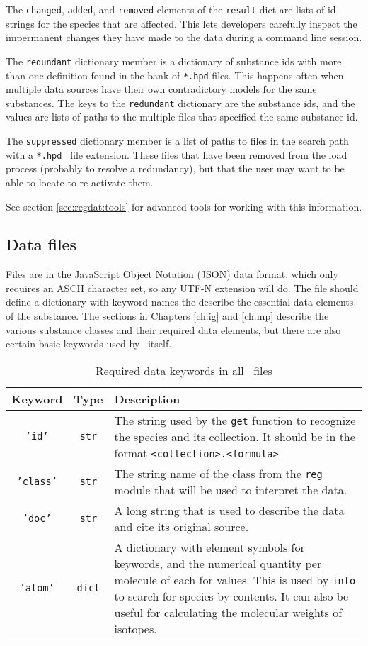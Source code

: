The \texttt{changed}, \texttt{added}, and \texttt{removed} elements of the \texttt{result} dict are lists of id strings for the species that are affected.  This lets developers carefully inspect the impermanent changes they have made to the data during a command line session.

The \texttt{redundant} dictionary member is a dictionary of substance ids with more than one definition found in the bank of \texttt{*.hpd} files.  This happens often when multiple data sources have their own contradictory models for the same substances.  The keys to the \texttt{redundant} dictionary are the substance ids, and the values are lists of paths to the multiple files that specified the same substance id.

The \texttt{suppressed} dictionary member is a list of paths to files in the search path with a \texttt{*.hpd~} file extension.  These files that have been removed from the load process (probably to resolve a redundancy), but that the user may want to be able to locate to re-activate them.

See section \ref{sec:regdat:tools} for advanced tools for working with this information.

\subsection{Data files}\label{sec:regdat:data}

Files are in the JavaScript Object Notation (JSON) data format, which only requires an ASCII character set, so any UTF-N extension will do.  The file should define a dictionary with keyword names the describe the essential data elements of the substance.  The sections in Chapters \ref{ch:ig} and \ref{ch:mp} describe the various substance classes and their required data elements, but there are also certain basic keywords used by \PM\ itself.

\begin{table}
\centering
\caption{Required data keywords in all \PM\ files}\label{tab:data:required}
\begin{tabular}{|ccp{2.5in}|}
\hline
Keyword & Type & Description\\
\hline
\texttt{'id'} & \texttt{str} & The string used by the \texttt{get} function to recognize the species and its collection.  It should be in the format \texttt{<collection>.<formula>}\\
\texttt{'class'} & \texttt{str} & The string name of the class from the \texttt{reg} module that will be used to interpret the data.\\
\texttt{'doc'} & \texttt{str} & A long string that is used to describe the data and cite its original source.\\
\texttt{'atom'} & \texttt{dict} & A dictionary with element symbols for keywords, and the numerical quantity per molecule of each for values.  This is used by \texttt{info} to search for species by contents.  It can also be useful for calculating the molecular weights of isotopes.\\
\hline
\end{tabular}
\end{table}

